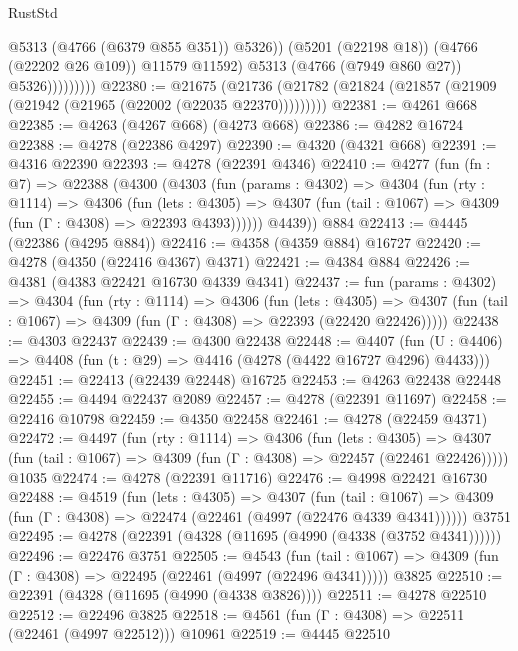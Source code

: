 \begin{lexlean}{RustStd}
\begin{coremodule}
                            @5313
                            (@4766 (@6379 @855 @351))
                            @5326))
                        (@5201 (@22198 @18))
                        (@4766 (@22202 @26 @109))
                        @11579
                        @11592)
                      @5313
                      (@4766 (@7949 @860 @27))
                      @5326)))))))))
@22380 := @21675
    (@21736 (@21782 (@21824 (@21857 (@21909 (@21942 (@21965 (@22002 (@22035 @22370)))))))))
@22381 := @4261 @668
@22385 := @4263 (@4267 @668) (@4273 @668)
@22386 := @4282 @16724
@22388 := @4278 (@22386 @4297)
@22390 := @4320 (@4321 @668)
@22391 := @4316 @22390
@22393 := @4278 (@22391 @4346)
@22410 := @4277
    (fun (fn : @7) =>
    @22388
      (@4300
        (@4303
          (fun (params : @4302) =>
          @4304
            (fun (rty : @1114) =>
            @4306
              (fun (lets : @4305) =>
              @4307 (fun (tail : @1067) => @4309 (fun (Γ : @4308) => @22393 @4393))))))
        @4439))
    @884
@22413 := @4445 (@22386 (@4295 @884))
@22416 := @4358 (@4359 @884) @16727
@22420 := @4278 (@4350 (@22416 @4367) @4371)
@22421 := @4384 @884
@22426 := @4381 (@4383 @22421 @16730 @4339 @4341)
@22437 := fun (params : @4302) =>
  @4304
    (fun (rty : @1114) =>
    @4306
      (fun (lets : @4305) =>
      @4307 (fun (tail : @1067) => @4309 (fun (Γ : @4308) => @22393 (@22420 @22426)))))
@22438 := @4303 @22437
@22439 := @4300 @22438
@22448 := @4407
    (fun (U : @4406) => @4408 (fun (t : @29) => @4416 (@4278 (@4422 @16727 @4296) @4433)))
@22451 := @22413 (@22439 @22448) @16725
@22453 := @4263 @22438 @22448
@22455 := @4494 @22437 @2089
@22457 := @4278 (@22391 @11697)
@22458 := @22416 @10798
@22459 := @4350 @22458
@22461 := @4278 (@22459 @4371)
@22472 := @4497
    (fun (rty : @1114) =>
    @4306
      (fun (lets : @4305) =>
      @4307 (fun (tail : @1067) => @4309 (fun (Γ : @4308) => @22457 (@22461 @22426)))))
    @1035
@22474 := @4278 (@22391 @11716)
@22476 := @4998 @22421 @16730
@22488 := @4519
    (fun (lets : @4305) =>
    @4307
      (fun (tail : @1067) =>
      @4309 (fun (Γ : @4308) => @22474 (@22461 (@4997 (@22476 @4339 @4341))))))
    @3751
@22495 := @4278 (@22391 (@4328 (@11695 (@4990 (@4338 (@3752 @4341))))))
@22496 := @22476 @3751
@22505 := @4543
    (fun (tail : @1067) => @4309 (fun (Γ : @4308) => @22495 (@22461 (@4997 (@22496 @4341)))))
    @3825
@22510 := @22391 (@4328 (@11695 (@4990 (@4338 @3826))))
@22511 := @4278 @22510
@22512 := @22496 @3825
@22518 := @4561 (fun (Γ : @4308) => @22511 (@22461 (@4997 @22512))) @10961
@22519 := @4445 @22510

\end{coremodule}
\end{lexlean}
